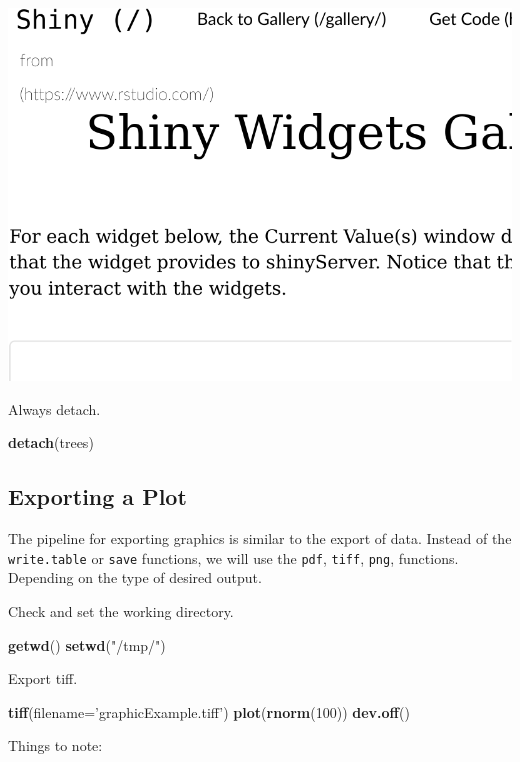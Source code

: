 \documentclass[]{book}
\newenvironment{Shaded}{\begin{snugshade}}{\end{snugshade}}
\newcommand{\DataTypeTok}[1]{\textcolor[rgb]{0.13,0.29,0.53}{#1}}
\newcommand{\DecValTok}[1]{\textcolor[rgb]{0.00,0.00,0.81}{#1}}
\newcommand{\KeywordTok}[1]{\textcolor[rgb]{0.13,0.29,0.53}{\textbf{#1}}}
\newcommand{\NormalTok}[1]{#1}
\newcommand{\StringTok}[1]{\textcolor[rgb]{0.31,0.60,0.02}{#1}}
\theoremstyle{definition}
\theoremstyle{definition}
\theoremstyle{definition}
\theoremstyle{remark}
\begin{document}
\includegraphics[width=0.5\linewidth]{Rcourse_files/figure-latex/unnamed-chunk-260-1}

Always detach.

\begin{Shaded}
\begin{Highlighting}[]
\KeywordTok{detach}\NormalTok{(trees)}
\end{Highlighting}
\end{Shaded}

\hypertarget{exporting-a-plot}{%
\subsection{Exporting a Plot}\label{exporting-a-plot}}

The pipeline for exporting graphics is similar to the export of data.
Instead of the \texttt{write.table} or \texttt{save} functions, we will use the \texttt{pdf}, \texttt{tiff}, \texttt{png}, functions. Depending on the type of desired output.

Check and set the working directory.

\begin{Shaded}
\begin{Highlighting}[]
\KeywordTok{getwd}\NormalTok{()}
\KeywordTok{setwd}\NormalTok{(}\StringTok{"/tmp/"}\NormalTok{)}
\end{Highlighting}
\end{Shaded}

Export tiff.

\begin{Shaded}
\begin{Highlighting}[]
\KeywordTok{tiff}\NormalTok{(}\DataTypeTok{filename=}\StringTok{'graphicExample.tiff'}\NormalTok{)}
\KeywordTok{plot}\NormalTok{(}\KeywordTok{rnorm}\NormalTok{(}\DecValTok{100}\NormalTok{))}
\KeywordTok{dev.off}\NormalTok{()}
\end{Highlighting}
\end{Shaded}

Things to note:
\end{document}
